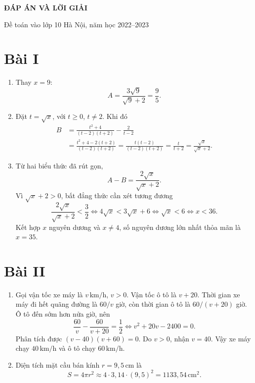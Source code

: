 \documentclass[12pt,a4paper]{article}
\begin{document}
\begin{center}{\Large\bfseries ĐÁP ÁN VÀ LỜI GIẢI}\par Đề toán vào lớp 10 Hà Nội, năm học 2022--2023\par{}\end{center}

\section*{Bài I}
\begin{enumerate}
\item Thay $x=9$:
\[
A=\frac{3\sqrt9}{\sqrt9+2}=\frac95.
\]
\item Đặt $t=\sqrt{x}$, với $t\ge0$, $t\ne2$. Khi đó
\begin{align*}
B&=\frac{t^2+4}{(t-2)(t+2)}-\frac2{t-2}\\
&=\frac{t^2+4-2(t+2)}{(t-2)(t+2)}
=\frac{t(t-2)}{(t-2)(t+2)}
=\frac{t}{t+2}=\frac{\sqrt{x}}{\sqrt{x}+2}.
\end{align*}
\item Từ hai biểu thức đã rút gọn,
\[
A-B=\frac{2\sqrt{x}}{\sqrt{x}+2}.
\]
Vì $\sqrt{x}+2>0$, bất đẳng thức cần xét tương đương
\[
\frac{2\sqrt{x}}{\sqrt{x}+2}<\frac32
\iff 4\sqrt{x}<3\sqrt{x}+6
\iff \sqrt{x}<6
\iff x<36.
\]
Kết hợp $x$ nguyên dương và $x\ne4$, số nguyên dương lớn nhất thỏa mãn là $x=35$.
\end{enumerate}

\section*{Bài II}
\begin{enumerate}
\item Gọi vận tốc xe máy là $v\,\mathrm{km/h}$, $v>0$. Vận tốc ô tô là $v+20$. Thời gian xe máy đi hết quãng đường là $60/v$ giờ, còn thời gian ô tô là $60/(v+20)$ giờ. Ô tô đến sớm hơn nửa giờ, nên
\[
\frac{60}{v}-\frac{60}{v+20}=\frac12
\iff v^2+20v-2400=0.
\]
Phân tích được $(v-40)(v+60)=0$. Do $v>0$, nhận $v=40$. Vậy xe máy chạy $40\,\mathrm{km/h}$ và ô tô chạy $60\,\mathrm{km/h}$.
\item Diện tích mặt cầu bán kính $r=9{,}5\,\mathrm{cm}$ là
\[
S=4\pi r^2\approx4\cdot3{,}14\cdot(9{,}5)^2=1133{,}54\,\mathrm{cm}^2.
\]
\end{enumerate}
\end{document}
